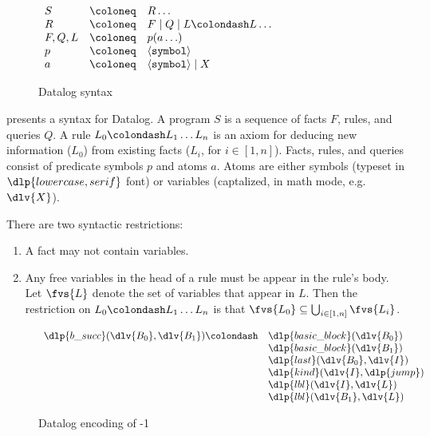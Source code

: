 \documentclass{article}
\begin{document}
\begin{figure}[t]
  \begin{center}$\begin{array}{l l l}
    S & \coloneq & R \ldots
    \\
    R & \coloneq & F \mid Q \mid L \colondash L \ldots
    \\
    F,Q,L & \coloneq & p(a\ldots)
    \\
    p & \coloneq & \langle {\tt symbol} \rangle
    \\
    a & \coloneq & \langle {\tt symbol} \rangle \mid X
  \end{array}$\end{center}
  \caption{Datalog syntax}
  \label{fig:datalog-syntax}
\end{figure}

 presents a syntax for Datalog.
A program $S$ is a sequence of facts $F$, rules, and queries $Q$.
A rule $L_0 \colondash L_1 \ldots L_n$ is an axiom for deducing new information ($L_0$) from existing facts ($L_i$, for $i \in [1,n]$).
Facts, rules, and queries consist of predicate symbols $p$ and atoms $a$.
Atoms are either symbols (typeset in $\dlp{lowercase, serif}$ font) or variables (captalized, in math mode, e.g. $\dlv{X}$).

There are two syntactic restrictions:
\begin{enumerate}
\item A fact may not contain variables.
\item Any free variables in the head of a rule must be appear in the rule's body.
  Let $\fvs{L}$ denote the set of variables that appear in $L$.
  Then the restriction on $L_0 \colondash L_1 \ldots L_n$ is that $\fvs{L_0} \subseteq \bigcup_{i \in [1,n]} \fvs{L_i}$.
\end{enumerate}

\begin{figure}
  \begin{center}$\begin{array}{l l l}
  \dlp{b\_succ}(\dlv{B_0}, \dlv{B_1}) \colondash
  & \dlp{basic\_block}(\dlv{B_0})
  &
  \\
  & \dlp{basic\_block}(\dlv{B_1})
  &
  \\
  & \dlp{last}(\dlv{B_0}, \dlv{I})
  &
  \\
  & \dlp{kind}(\dlv{I}, \dlp{jump})
  &
  \\
  & \dlp{lbl}(\dlv{I}, \dlv{L})
  &
  \\
  & \dlp{lbl}(\dlv{B_1}, \dlv{L})
  &
  \end{array}$\end{center}
  \caption{Datalog encoding of {\bb}-1}
  \label{fig:datalog-bb}
\end{figure}
\end{document}

